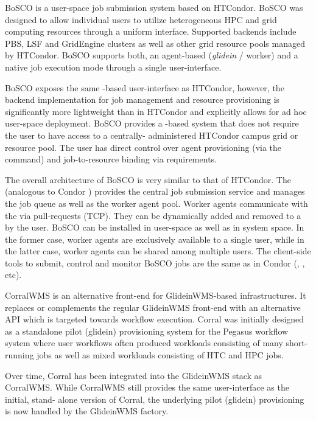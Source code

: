 \documentclass{sig-alternate}
\begin{document}
BoSCO is a user-space job submission system based on HTCondor. BoSCO was
designed to allow individual users to utilize heterogeneous HPC and grid
computing resources through a uniform interface. Supported backends include
PBS, LSF and GridEngine clusters as well as other  grid resource pools managed
by HTCondor. BoSCO supports both, an agent-based (\textit{glidein} / worker)
and a native job execution mode through a single user-interface.

BoSCO exposes the same -based user-interface as HTCondor,
however, the backend implementation for job management and resource
provisioning is significantly more lightweight than in HTCondor and explicitly
allows for ad hoc user-space deployment. BoSCO provides a \pilot-based
system that does not require the user to have access to a centrally-
administered HTCondor campus grid or  resource pool. The user has direct
control over \pilot agent provisioning (via the 
command) and job-to-resource binding via  requirements.

The overall architecture of BoSCO is very similar to that of HTCondor. The
 (analogous to Condor ) provides the
central job submission service and manages the job queue as well as the worker
agent pool. Worker agents communicate with the  via
pull-requests (TCP). They can be dynamically added and removed to a
 by the user. BoSCO can be installed in user-space
as well as in system space. In the former case, worker agents are exclusively
available to a single user, while in the latter case, worker agents can be
shared among multiple users. The client-side tools to submit, control and
monitor BoSCO jobs are the same as in Condor (,
, etc).

CorralWMS is an alternative front-end for GlideinWMS-based
infrastructures. It replaces or complements the regular GlideinWMS front-end
with an alternative API which is targeted towards workflow execution. Corral was
initially designed as a standalone pilot (glidein) provisioning system for
the Pegasus workflow system where user  workflows often produced workloads
consisting of many short-running jobs as well as mixed workloads consisting of
HTC and HPC jobs.

Over time, Corral has been integrated into the GlideinWMS stack as CorralWMS.
While CorralWMS still provides the same user-interface as the initial, stand-
alone version of Corral, the underlying pilot (glidein) provisioning is
now handled by the GlideinWMS factory.
\end{document}
